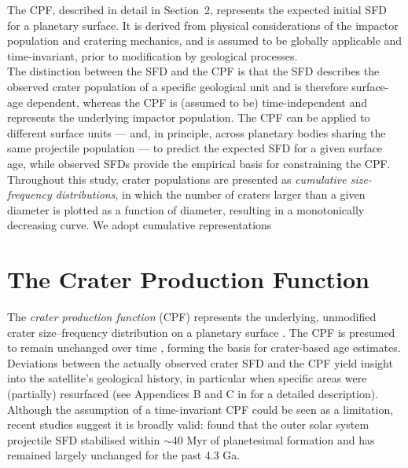\documentclass[preprint,11pt,3p,times,authoryear]{elsarticle}
\begin{document}
The CPF, described in detail in Section~2, represents the expected initial SFD for a planetary surface. It is derived from physical considerations of the impactor population and cratering mechanics, and is assumed to be globally applicable and time-invariant, prior to modification by geological processes. \\

The distinction between the SFD and the CPF is that the SFD describes the observed crater population of a specific geological unit and is therefore surface-age dependent, whereas the CPF is (assumed to be) time-independent and represents the underlying impactor population. The CPF can be applied to different surface units --- and, in principle, across planetary bodies sharing the same projectile population --- to predict the expected SFD for a given surface age, while observed SFDs provide the empirical basis for constraining the CPF.\\

Throughout this study, crater populations are presented as \textit{cumulative size-frequency distributions}, in which the number of craters larger than a given diameter is plotted as a function of diameter, resulting in a monotonically decreasing curve. We adopt cumulative representations %

\section{The Crater Production Function}
\label{sub:intro_cpf}
The \textit{crater production function} (CPF) represents the underlying, unmodified crater size–frequency distribution on a planetary surface \citep{Neukum1975}. The CPF is presumed to remain unchanged over time \citep{Neukum1975,Neukum1983,Werner2014,Werner2023}, forming the basis for crater-based age estimates. Deviations between the actually observed crater SFD and the CPF yield insight into the satellite's geological history, in particular when specific areas were (partially) resurfaced (see Appendices B and C in \citet{Werner2009} for a detailed description).
Although the assumption of a time-invariant CPF could be seen as a limitation, recent studies suggest it is broadly valid: \citet{Bottke2024} found that the outer solar system projectile SFD stabilised within $\sim$40 Myr of planetesimal formation and has remained largely unchanged for the past 4.3 Ga. \\
\end{document}
